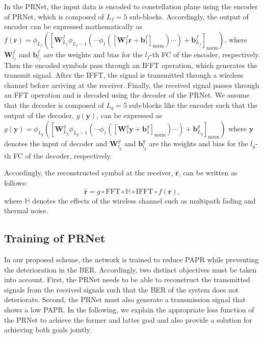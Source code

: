 \documentclass[journal]{IEEEtran}
\begin{document}
In the PRNet, the input data is encoded to constellation plane using the encoder of PRNet, which is composed of $L_f = 5$ sub-blocks. Accordingly, the output of encoder can be expressed mathematically as $f(\boldsymbol{r}) = \phi_{L_f}([\boldsymbol{W}_{L_f}^f \phi_{L_f-1}( \cdots \phi_1([\boldsymbol{W}_1^f \boldsymbol{r} + \boldsymbol{b}_1^f]_{\text{norm}}) \cdots ) + \boldsymbol{b}_{L_f}^f]_{\text{norm}})$, where $\boldsymbol{W}_{l_f}^f$ and $\boldsymbol{b}_{l_f}^f$ are the weights and bias for the $l_f$-th FC of the encoder, respectively. Then the encoded symbols pass through an IFFT operation, which generates the transmit signal. After the IFFT, the signal is transmitted through a wireless channel before arriving at the receiver. Finally, the received signal passes through an FFT operation and is decoded using the decoder of the PRNet. We assume that the decoder is composed of $L_g = 5$ sub-blocks like the encoder such that the output of the decoder, $g(\boldsymbol{y})$, can be expressed as $g(\boldsymbol{y}) = \phi_{L_g}([\boldsymbol{W}_{L_g}^g \phi_{L_g-1}( \cdots \phi_1([\boldsymbol{W}_1^g \boldsymbol{y} + \boldsymbol{b}_1^g]_{\text{norm}}) \cdots ) + \boldsymbol{b}_{L_g}^g]_{\text{norm}})$ where $\boldsymbol{y}$ denotes the input of decoder and $\boldsymbol{W}_{l_g}^g$ and $\boldsymbol{b}_{l_g}^g$ are the weights and bias for the $l_g$-th FC of the decoder, respectively.

Accordingly, the reconstructed symbol at the receiver, $\hat{\boldsymbol{r}}$, can be written as follows:
\begin{equation}
\hat{\boldsymbol{r}} = g \circ \text{FFT} \circ \mathbb{H} \circ \text{IFFT} \circ f(\boldsymbol{r}) ,
\label{eq4}
\end{equation}
where $\mathbb{H}$ denotes the effects of the wireless channel such as multipath fading and thermal noise.

\subsection{Training of PRNet}
In our proposed scheme, the network is trained to reduce PAPR while preventing the deterioration in the BER. Accordingly, two distinct objectives must be taken into account. First, the PRNet needs to be able to reconstruct the transmitted signals from the received signals such that the BER of the system does not deteriorate. Second, the PRNet must also generate a transmission signal that shows a low PAPR. In the following, we explain the appropriate loss function of the PRNet to achieve the former and latter goal and also provide a solution for achieving both goals jointly.
\end{document}
